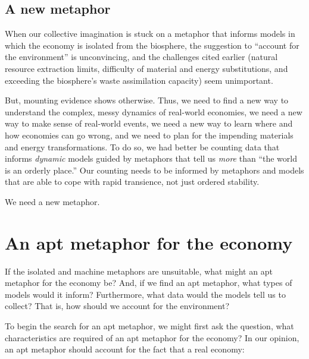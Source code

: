 \subsection{A new metaphor}
\label{sec:new_metaphor}

When our collective imagination is stuck on a metaphor that 
informs models in which the economy is isolated from the biosphere,
the suggestion to ``account for the environment'' is unconvincing, and 
the challenges cited earlier (natural resource extraction limits,
difficulty of material and energy substitutions, and 
exceeding the biosphere's waste assimilation capacity)
seem unimportant. 

But, mounting evidence shows otherwise. 
Thus, we need to find a new way to understand the complex, 
messy dynamics of real-world economies,
we need a new way to make sense of real-world events, 
we need a new way to learn where and how economies can go wrong, and
we need to plan for the impending materials and energy transformations.
To do so, we had better be counting data that informs \emph{dynamic} models
guided by metaphors that tell us \emph{more} than ``the world is an orderly place.''
Our counting needs to be informed by metaphors and models that are
able to cope with rapid transience,
not just ordered stability.

We need a new metaphor.



\section{An apt metaphor for the economy}
\label{sec:apt_metaphor}

If the isolated and machine metaphors are unsuitable, 
what might an apt metaphor for the economy be?
And, if we find an apt metaphor, what types of models would it inform?
Furthermore, what data would the models tell us to collect?
That is, how should we account for the environment?

To begin the search for an apt metaphor, 
we might first ask the question, 
what characteristics are required of an apt metaphor for the economy?
In our opinion, an apt metaphor should account for the fact 
that a real economy:

